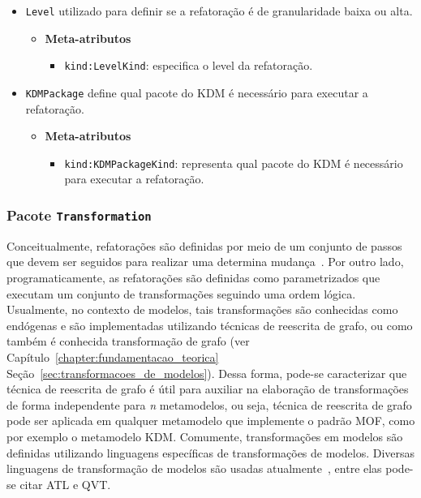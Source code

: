 \begin{itemize}
\item \texttt{Level} utilizado para definir se a refatoração é de granularidade baixa ou alta.

\begin{itemize}
	\item \textbf{Meta-atributos}
		\begin{itemize}
			\item \texttt{kind:LevelKind}: especifica o level da refatoração.
		\end{itemize}	
\end{itemize} 

\item \texttt{KDMPackage} define qual pacote do KDM é necessário para executar a refatoração.

\begin{itemize}
	\item \textbf{Meta-atributos}
		\begin{itemize}
			\item \texttt{kind:KDMPackageKind}: representa qual pacote do KDM é necessário para executar a refatoração.
		\end{itemize}	
\end{itemize} 

\end{itemize}

\subsubsection{Pacote \texttt{Transformation}}

Conceitualmente, refatorações são definidas por meio de um conjunto de passos que devem ser seguidos para realizar uma determina mudança~\cite{Fowler1999, Demeyer1}. Por outro lado, programaticamente, as refatorações são definidas como  parametrizados que executam um conjunto de transformações seguindo uma ordem lógica. Usualmente, no contexto de modelos, tais transformações são conhecidas como endógenas e são implementadas utilizando técnicas de reescrita de grafo, ou como também é conhecida transformação de grafo (ver Capítulo~\ref{chapter:fundamentacao_teorica} Seção~\ref{sec:transformacoes_de_modelos}). Dessa forma, pode-se caracterizar que técnica de reescrita de grafo é útil para auxiliar na elaboração de transformações de forma independente para \textit{n} metamodelos, ou seja, técnica de reescrita de grafo pode ser aplicada em qualquer metamodelo que implemente o padrão MOF, como por exemplo o metamodelo KDM. Comumente, transformações em modelos são definidas utilizando linguagens específicas de transformações de modelos. Diversas linguagens de transformação de modelos são usadas atualmente~\cite{Biehl_2010, Allilaire_06}, entre elas pode-se citar ATL e QVT.

